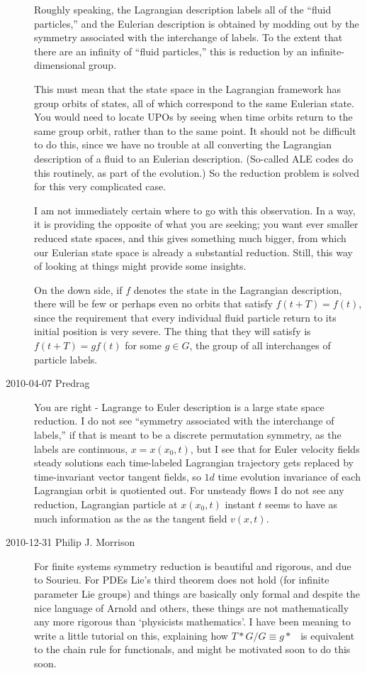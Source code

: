 \begin{description}
Roughly speaking, the Lagrangian description labels all of
the ``fluid particles,'' and the Eulerian description is
obtained by modding out by the symmetry associated with the
interchange of labels.  To the extent that there are an
infinity of ``fluid particles,'' this is reduction by an
infinite-dimensional group.

This must mean that the state space in the Lagrangian
framework has group orbits of states, all of which correspond
to the same Eulerian state.  You would need to locate UPOs by
seeing when time orbits return to the same group orbit,
rather than to the same point.  It should not be difficult to
do this, since we have no trouble at all converting the
Lagrangian description of a fluid to an Eulerian description.
(So-called ALE codes do this routinely, as part of the
evolution.)  So the reduction problem is solved for this very
complicated case.

I am not immediately certain where to go with this
observation.  In a way, it is providing the opposite of what
you are seeking; you want ever smaller reduced state spaces,
and this gives something much bigger, from which our Eulerian
state space is already a substantial reduction.  Still, this
way of looking at things might provide some insights.

On the down side, if $f$ denotes the state in the Lagrangian
description, there will be few or perhaps even no orbits that
satisfy $f(t+T) = f(t)$, since the requirement that every
individual fluid particle return to its initial position is
very severe.  The thing that they will satisfy is $f(t+T) = g
f(t)$ for some $g \in G$, the group of all interchanges of
particle labels.

\item[2010-04-07 Predrag]
You are right - Lagrange to Euler description
is a large state space reduction. I do not see
``symmetry associated with the interchange of labels,''
if that is meant to be a discrete permutation symmetry, as
the labels are continuous, $x=x(x_0,t)$, but I see that
for Euler velocity fields steady solutions each time-labeled
Lagrangian trajectory gets replaced by time-invariant
vector tangent fields, so $1d$ time evolution invariance of each
Lagrangian
orbit is quotiented out. For unsteady flows I do not see any reduction,
Lagrangian particle at $x(x_0,t)$ instant $t$ seems to have as
much information as the as the tangent field $v(x,t)$.


\item[2010-12-31 Philip J. Morrison]
For finite systems symmetry reduction is beautiful and rigorous, and due
to Sourieu. For PDEs Lie's third theorem does not hold (for infinite
parameter Lie groups) and things are basically only formal and despite
the nice language of Arnold and others, these things are not
mathematically any more rigorous than `physicists mathematics'.  I have
been meaning to write a little tutorial on this, explaining how
$T*G/G\equiv g*$ \etc\ is equivalent to the chain rule for functionals,
and might be motivated soon to do this soon.


\end{description}
